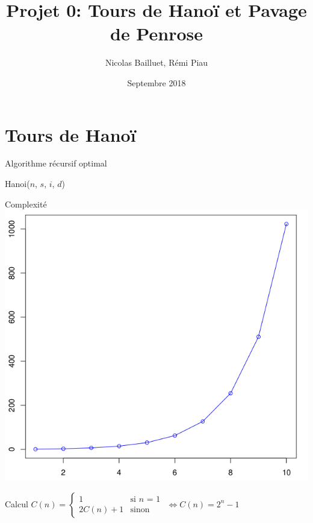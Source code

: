 \documentclass[usenames,dvipsnames,serif,14pt]{beamer}%
\author{Nicolas Bailluet, Rémi Piau}
\title{Projet 0: Tours de Hanoï et Pavage de Penrose}
\institute{L3, ENS Rennes}
\date{Septembre 2018}
\begin{document}
\beamertemplatenavigationsymbolsempty

\begin{frame}
\titlepage
\end{frame}

\section{Tours de Hanoï}

\begin{frame}{Algorithme récursif optimal}
  \begin{algorithm}[H]
  \caption{Hanoi($n$, $s$, $i$, $d$)}
  \end{algorithm}
\end{frame}

\begin{frame}{Complexité}
  \centering
  \includegraphics[scale=0.2]{R_curve.png}
  \begin{block}{Calcul}
    $C(n) =
    \begin{cases}
      1 & \mbox{si $n$ = 1}\\
      2C(n)+1 & \mbox{sinon}
    \end{cases}
    $
    $\Leftrightarrow \boxed{C(n) = 2^{n}-1}$
  \end{block}
\end{frame}
\end{document}
